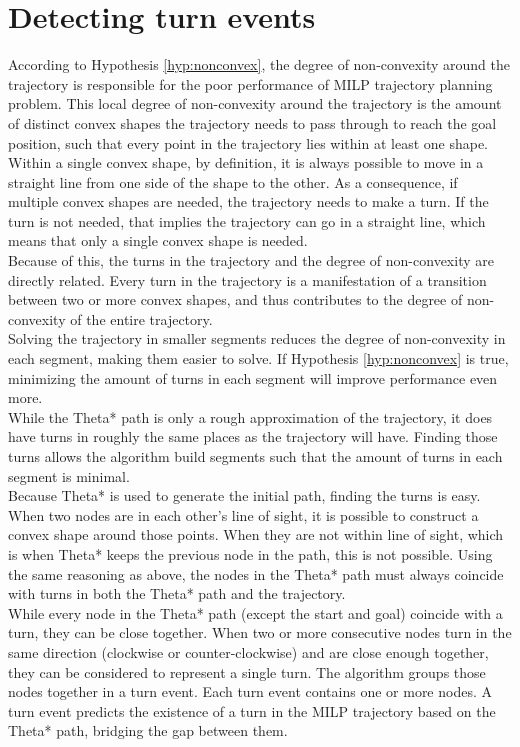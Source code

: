 \section{Detecting turn events}
\label{subsec:corner-events}
According to Hypothesis \ref{hyp:nonconvex}, the degree of non-convexity around the trajectory is responsible for the poor performance of MILP trajectory planning problem. This local degree of non-convexity around the trajectory is the amount of distinct convex shapes the trajectory needs to pass through to reach the goal position, such that every point in the trajectory lies within at least one shape. \\
Within a single convex shape, by definition, it is always possible to move in a straight line from one side of the shape to the other. As a consequence, if multiple convex shapes are needed, the trajectory needs to make a turn. If the turn is not needed, that implies the trajectory can go in a straight line, which means that only a single convex shape is needed. \\
Because of this, the turns in the trajectory and the degree of non-convexity are  directly related. Every turn in the trajectory is a manifestation of a transition between two or more convex shapes, and thus contributes to the degree of non-convexity of the entire trajectory. \\
Solving the trajectory in smaller segments reduces the degree of non-convexity in each segment, making them easier to solve. If Hypothesis \ref{hyp:nonconvex} is true, minimizing the amount of turns in each segment will improve performance even more. \\
While the Theta* path is only a rough approximation of the trajectory, it does have turns in roughly the same places as the trajectory will have. Finding those turns allows the algorithm build segments such that the amount of turns in each segment is minimal. \\
Because Theta* is used to generate the initial path, finding the turns is easy. When two nodes are in each other's line of sight, it is possible to construct a convex shape around those points. When they are not within line of sight, which is when Theta* keeps the previous node in the path, this is not possible. Using the same reasoning as above, the nodes in the Theta* path must always coincide with turns in both the Theta* path and the trajectory. \\
While every node in the Theta* path (except the start and goal) coincide with a turn, they can be close together. When two or more consecutive nodes turn in the same direction (clockwise or counter-clockwise) and are close enough together, they can be considered to represent a single turn. The algorithm groups those nodes together in a turn event. Each turn event contains one or more nodes. A turn event predicts the existence of a turn in the MILP trajectory based on the   Theta* path, bridging the gap between them.
